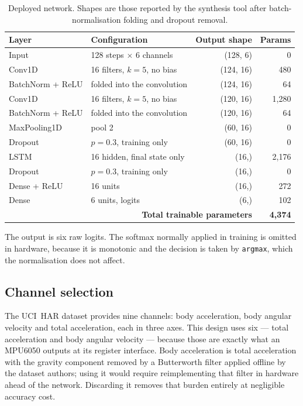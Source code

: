 \documentclass[11pt,a4paper]{article}
\begin{document}
\begin{table}[h]
\centering
\begin{tabular}{llr r}
\toprule
\textbf{Layer} & \textbf{Configuration} & \textbf{Output shape} & \textbf{Params} \\
\midrule
Input           & 128 steps $\times$ 6 channels   & (128, 6)  & 0 \\
Conv1D          & 16 filters, $k = 5$, no bias    & (124, 16) & 480 \\
BatchNorm + ReLU& folded into the convolution     & (124, 16) & 64 \\
Conv1D          & 16 filters, $k = 5$, no bias    & (120, 16) & 1{,}280 \\
BatchNorm + ReLU& folded into the convolution     & (120, 16) & 64 \\
MaxPooling1D    & pool 2                          & (60, 16)  & 0 \\
Dropout         & $p = 0.3$, training only        & (60, 16)  & 0 \\
LSTM            & 16 hidden, final state only     & (16,)     & 2{,}176 \\
Dropout         & $p = 0.3$, training only        & (16,)     & 0 \\
Dense + ReLU    & 16 units                        & (16,)     & 272 \\
Dense           & 6 units, logits                 & (6,)      & 102 \\
\midrule
\multicolumn{3}{r}{\textbf{Total trainable parameters}} & \textbf{4{,}374} \\
\bottomrule
\end{tabular}
\caption{Deployed network. Shapes are those reported by the synthesis tool
after batch-normalisation folding and dropout removal.}
\end{table}

The output is six raw logits. The softmax normally applied in training is
omitted in hardware, because it is monotonic and the decision is taken by
\texttt{argmax}, which the normalisation does not affect.

\subsection{Channel selection}

The UCI~HAR dataset provides nine channels: body acceleration, body angular
velocity and total acceleration, each in three axes. This design uses six ---
total acceleration and body angular velocity --- because those are exactly what
an MPU6050 outputs at its register interface. Body acceleration is total
acceleration with the gravity component removed by a Butterworth filter applied
offline by the dataset authors; using it would require reimplementing that
filter in hardware ahead of the network. Discarding it removes that burden
entirely at negligible accuracy cost.
\end{document}
